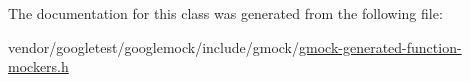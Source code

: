 The documentation for this class was generated from the following file\+:\begin{DoxyCompactItemize}
\item 
vendor/googletest/googlemock/include/gmock/\hyperlink{gmock-generated-function-mockers_8h}{gmock-\/generated-\/function-\/mockers.\+h}\end{DoxyCompactItemize}
